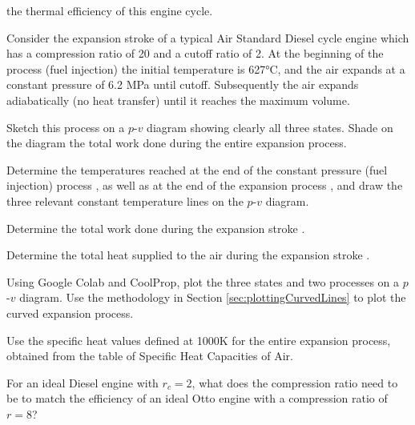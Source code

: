 \begin{homework}
\begin{questionparts}
  \item  the thermal efficiency of this engine cycle. \answer{ [$\eta_{th}$ = 56\%]}
  \end{questionparts}
  \newpage
  \question Consider the expansion stroke of a typical Air Standard Diesel cycle engine which has a compression ratio of 20 and a cutoff ratio of 2. At the beginning of the process (fuel injection) the initial temperature is 627°C, and the air expands at a constant pressure of 6.2 MPa until cutoff. Subsequently the air expands adiabatically (no heat transfer) until it reaches the maximum volume.
\begin{questionparts}
\item Sketch this process on a $p$-$v$ diagram showing clearly all three states. Shade on the diagram the total work done during the entire expansion process.
\item Determine the temperatures reached at the end of the constant pressure (fuel injection) process \answer{ [1800K]}, as well as at the end of the expansion process \answer{ [830K]}, and draw the three relevant constant temperature lines on the $p$-$v$ diagram.
\item Determine the total work done during the expansion stroke \answer{ [1087 kJ/kg]}.
\item Determine the total heat supplied to the air during the expansion stroke \answer{ [1028 kJ/kg]}.
\item Using Google Colab and CoolProp, plot the three states and two processes on a $p$-$v$ diagram.  Use the methodology in Section \ref{sec:plottingCurvedLines} to plot the curved expansion process.
\end{questionparts}
Use the specific heat values defined at 1000K for the entire expansion process, obtained from the table of Specific Heat Capacities of Air.

\question For an ideal Diesel engine with $r_c = 2$, what does the compression ratio need to be to match the efficiency of an ideal Otto engine with a compression ratio of $r=8$?

\end{homework}
